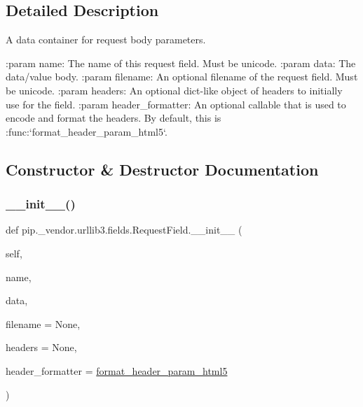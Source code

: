 \subsection{Detailed Description}
\begin{DoxyVerb}A data container for request body parameters.

:param name:
    The name of this request field. Must be unicode.
:param data:
    The data/value body.
:param filename:
    An optional filename of the request field. Must be unicode.
:param headers:
    An optional dict-like object of headers to initially use for the field.
:param header_formatter:
    An optional callable that is used to encode and format the headers. By
    default, this is :func:`format_header_param_html5`.
\end{DoxyVerb}
 

\subsection{Constructor \& Destructor Documentation}
\mbox{\label{classpip_1_1__vendor_1_1urllib3_1_1fields_1_1RequestField_a5d21d86e38c7dceb0f9731ea4827b3e9}} 
\subsubsection{\texorpdfstring{\+\_\+\+\_\+init\+\_\+\+\_\+()}{\_\_init\_\_()}}
{\footnotesize\ttfamily def pip.\+\_\+vendor.\+urllib3.\+fields.\+Request\+Field.\+\_\+\+\_\+init\+\_\+\+\_\+ (\begin{DoxyParamCaption}\item[{}]{self,  }\item[{}]{name,  }\item[{}]{data,  }\item[{}]{filename = {\ttfamily None},  }\item[{}]{headers = {\ttfamily None},  }\item[{}]{header\+\_\+formatter = {\ttfamily \hyperlink{namespacepip_1_1__vendor_1_1urllib3_1_1fields_a969066e8f71fd6c85bcfa7d6a81752a0}{format\+\_\+header\+\_\+param\+\_\+html5}} }\end{DoxyParamCaption})}



